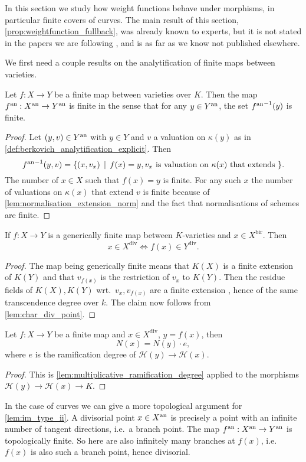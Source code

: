 In this section we study how weight functions behave under morphisms, in particular finite covers of curves. 
The main result of this section, \cref{prop:weightfunction_fullback}, was already known to experts, but it is not stated in the papers we are following \cite{bakerWeightFunctionsBerkovich2016,nicaiseBerkovichSkeletaBirational2016,mustataWeightFunctionsNonArchimedean2015}, and is as far as we know not published elsewhere. 

We first need a couple results on the analytification of finite maps between varieties. 

\begin{lemma}
	Let $f: X \to Y$ be a finite map between varieties over  $K$. 
Then the map $f{}^{\text{an}}: X{}^{\text{an}} \to Y{}^{\text{an}}$ is finite in the sense that for any $y \in Y{}^{\text{an}}$, the set ${f{}^{\text{an}}}^{-1}(y)$ is finite. 
\end{lemma}
\begin{proof}
	Let $(y, v) \in Y{}^{\text{an}}$ with $y \in Y$ and $v$ a valuation on $\kappa(y)$ as in \cref{def:berkovich_analytification_explicit}. 
	Then \[
		{f\an}^{-1} (y, v) = \{(x, v_x) \st f(x) = y, v_x \text{ is valuation on $\kappa(x)$ that extends }  \} 
	.\]
	The number of $x \in X$ such that $f(x) = y$ is finite. 
	For any such $x$ the number of valuations on $\kappa(x)$ that extend $v$ is finite because of \cref{lem:normalisation_extension_norm} and the fact that normalisations of schemes are finite. 
\end{proof}

\begin{lemma}\label{lem:im_type_ii}
	If $f: X \to Y$ is a generically finite map between $K$-varieties and $x \in X^{\text{bir}}$. Then
	\[
		x \in X^\text{div} \iff f(x) \in Y^\text{div}
	.\] 
\end{lemma}
\begin{proof}
	The map being generically finite means that $K(X)$ is a finite extension of $K(Y)$ and that $v_{f(x)}$ is the restriction of $v_x$ to $K(Y)$. 
	Then the residue fields of $K(X), K(Y)$ wrt.\ $v_x, v_{f(x)}$ are a finite extension , hence of the same transcendence degree over $k$. 
	The claim now follows from \cref{lem:char_div_point}.
\end{proof}
\begin{lemma}
	Let $f: X \to Y$ be a finite map and $x \in X^{\text{div}}$, $y = f(x)$, 
	then \[
		N(x) = N(y)\cdot e
	,\]
	where $e$ is the ramification degree of $\mathcal{H} (y) \to \mathcal{H} (x)$. 
\end{lemma}
\begin{proof}
	This is \cref{lem:multiplicative_ramification_degree} applied to the morphisms $\mathcal{H} (y) \to \mathcal{H} (x) \to K$.
\end{proof}
\begin{remark}
	In the case of curves we can give a more topological argument for \cref{lem:im_type_ii}. 
	A divisorial point $x \in X{}^{\text{an}}$ is precisely a point with an infinite number of tangent directions, i.e.\ a branch point.
	The map $f{}^{\text{an}}: X{}^{\text{an}} \to Y{}^{\text{an}} $ is topologically finite.
	So here are also infinitely many branches at $f(x)$, i.e.\ $f(x)$ is also such a branch point, hence divisorial. 	
\end{remark}

